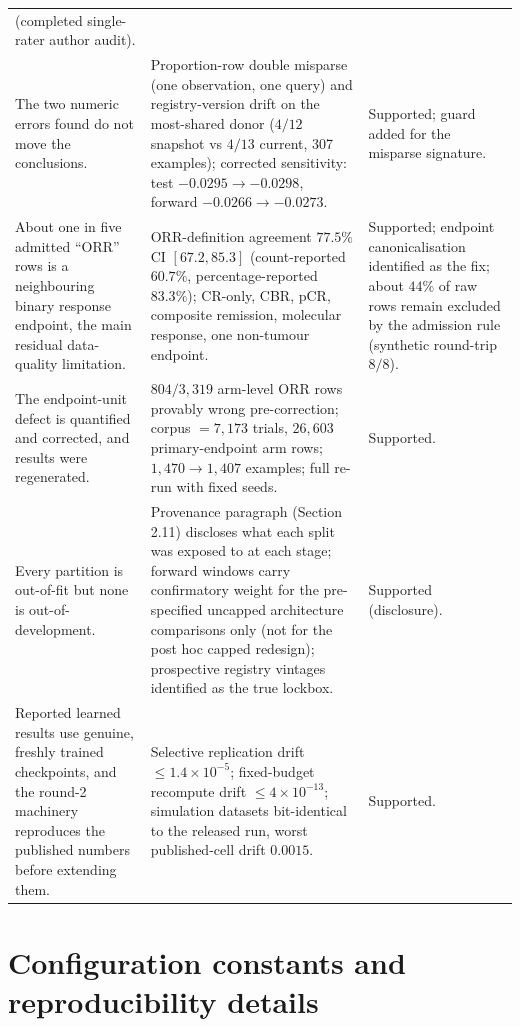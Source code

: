 \documentclass[11pt]{article}
\begin{document}
\begin{longtable}{p{} p{} p{}}
(completed single-rater author audit). \\
The two numeric errors found do not move the conclusions. & Proportion-row
double misparse (one observation, one query) and registry-version drift on
the most-shared donor ($4/12$ snapshot vs $4/13$ current, 307 examples);
corrected sensitivity: test $-0.0295 \to -0.0298$, forward $-0.0266 \to
-0.0273$. & Supported; guard added for the misparse signature. \\
About one in five admitted ``ORR'' rows is a neighbouring binary response
endpoint, the main residual data-quality limitation. & ORR-definition
agreement $77.5\%$ CI $[67.2,85.3]$ (count-reported $60.7\%$,
percentage-reported $83.3\%$); CR-only, CBR, pCR, composite remission,
molecular response, one non-tumour endpoint. & Supported; endpoint
canonicalisation identified as the fix; about $44\%$ of raw rows remain
excluded by the admission rule (synthetic round-trip $8/8$). \\
The endpoint-unit defect is quantified and corrected, and results were
regenerated. & $804/3{,}319$ arm-level ORR rows provably wrong pre-correction;
corpus $= 7{,}173$ trials, $26{,}603$ primary-endpoint arm rows;
$1{,}470 \to 1{,}407$ examples; full re-run with fixed seeds. & Supported. \\
Every partition is out-of-fit but none is out-of-development. & Provenance
paragraph (Section 2.11) discloses what each split was exposed to at each
stage; forward windows carry confirmatory weight for the pre-specified
uncapped architecture comparisons only (not for the post hoc capped
redesign); prospective registry
vintages identified as the true lockbox. & Supported (disclosure). \\
Reported learned results use genuine, freshly trained checkpoints, and the
round-2 machinery reproduces the published numbers before extending them. &
Selective replication drift $\le 1.4\times10^{-5}$; fixed-budget recompute
drift $\le 4\times10^{-13}$; simulation datasets bit-identical to the
released run, worst published-cell drift $0.0015$. & Supported. \\
\bottomrule
\end{longtable}

\section{Configuration constants and reproducibility details}
\end{document}
